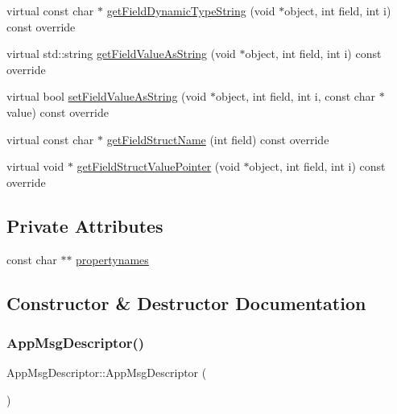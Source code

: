 \begin{DoxyCompactItemize}
\item 
virtual const char $\ast$ \hyperlink{classAppMsgDescriptor_a34ca59ce0eb79e96189a0c6f31fa8ce0}{get\+Field\+Dynamic\+Type\+String} (void $\ast$object, int field, int i) const override
\item 
virtual std\+::string \hyperlink{classAppMsgDescriptor_aa43546ba09c6953ecd4fc9e66d16bd76}{get\+Field\+Value\+As\+String} (void $\ast$object, int field, int i) const override
\item 
virtual bool \hyperlink{classAppMsgDescriptor_a0e77c504e3174dfd8c666d286c68b37b}{set\+Field\+Value\+As\+String} (void $\ast$object, int field, int i, const char $\ast$value) const override
\item 
virtual const char $\ast$ \hyperlink{classAppMsgDescriptor_a3879e3c38670b7a85ef43ba4a1ae7408}{get\+Field\+Struct\+Name} (int field) const override
\item 
virtual void $\ast$ \hyperlink{classAppMsgDescriptor_a5eeec27327bfa4d54924a9913006b689}{get\+Field\+Struct\+Value\+Pointer} (void $\ast$object, int field, int i) const override
\end{DoxyCompactItemize}
\subsection*{Private Attributes}
\begin{DoxyCompactItemize}
\item 
const char $\ast$$\ast$ \hyperlink{classAppMsgDescriptor_a4fb3b9dd77f943bb3aa1587c8d28c1c8}{propertynames}
\end{DoxyCompactItemize}


\subsection{Constructor \& Destructor Documentation}
\mbox{\label{classAppMsgDescriptor_a6db2ddcf43396f5c9f97311e757e3b51}} 
\subsubsection{\texorpdfstring{App\+Msg\+Descriptor()}{AppMsgDescriptor()}}
{\footnotesize\ttfamily App\+Msg\+Descriptor\+::\+App\+Msg\+Descriptor (\begin{DoxyParamCaption}{ }\end{DoxyParamCaption})}

